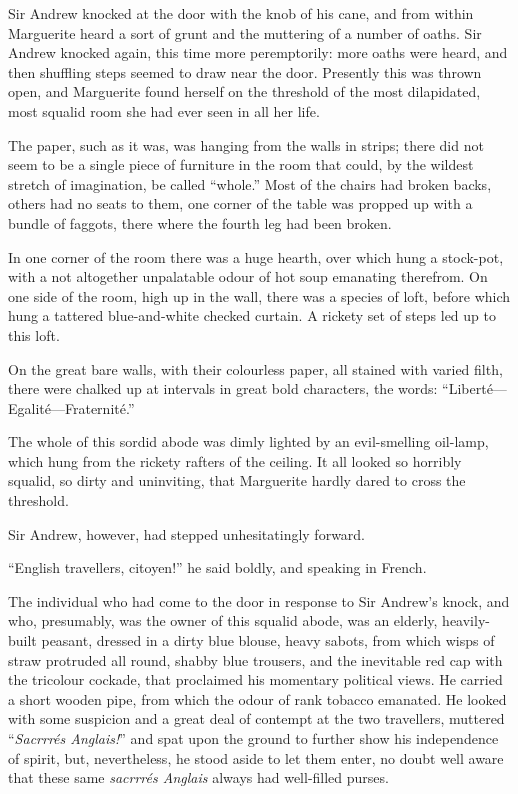 \documentclass[paper=a5,BCOR=7mm,twoside,DIV=calc,12pt,usegeometry,chapterprefix,endperiod,headings=big]{scrbook}
\begin{document}
Sir Andrew knocked at the door with the knob of his cane, and from within Marguerite heard a sort of grunt and the muttering of a number of oaths. Sir Andrew knocked again, this time more peremptorily: more oaths were heard, and then shuffling steps seemed to draw near the door. Presently this was thrown open, and Marguerite found herself on the threshold of the most dilapidated, most squalid room she had ever seen in all her life.

The paper, such as it was, was hanging from the walls in strips; there did not seem to be a single piece of furniture in the room that could, by the wildest stretch of imagination, be called \enquote{whole.} Most of the chairs had broken backs, others had no seats to them, one corner of the table was propped up with a bundle of faggots, there where the fourth leg had been broken.

In one corner of the room there was a huge hearth, over which hung a stock-pot, with a not altogether unpalatable odour of hot soup emanating therefrom. On one side of the room, high up in the wall, there was a species of loft, before which hung a tattered blue-and-white checked curtain. A rickety set of steps led up to this loft.

On the great bare walls, with their colourless paper, all stained with varied filth, there were chalked up at intervals in great bold characters, the words: \enquote{Liberté---Egalité---Fraternité.}

The whole of this sordid abode was dimly lighted by an evil-smelling oil-lamp, which hung from the rickety rafters of the ceiling. It all looked so horribly squalid, so dirty and uninviting, that Marguerite hardly dared to cross the threshold.

Sir Andrew, however, had stepped unhesitatingly forward.

\enquote{English travellers, citoyen!} he said boldly, and speaking in French.

The individual who had come to the door in response to Sir Andrew's knock, and who, presumably, was the owner of this squalid abode, was an elderly, heavily-built peasant, dressed in a dirty blue blouse, heavy sabots, from which wisps of straw protruded all round, shabby blue trousers, and the inevitable red cap with the tricolour cockade, that proclaimed his momentary political views. He carried a short wooden pipe, from which the odour of rank tobacco emanated. He looked with some suspicion and a great deal of contempt at the two travellers, muttered \enquote{\textit{Sacrrrés Anglais!}} and spat upon the ground to further show his independence of spirit, but, nevertheless, he stood aside to let them enter, no doubt well aware that these same \textit{sacrrrés Anglais} always had well-filled purses.
\end{document}
